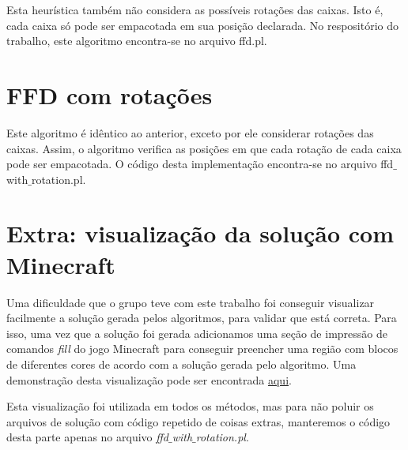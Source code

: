 \documentclass[12pt]{article}
\begin{document}
Esta heurística também não considera as possíveis rotações das caixas. Isto é, cada caixa só pode ser empacotada em sua posição declarada. No respositório do trabalho, este algoritmo encontra-se no arquivo ffd.pl.


\section{FFD com rotações}

Este algoritmo é idêntico ao anterior, exceto por ele considerar rotações das caixas. Assim, o algoritmo verifica as posições em que cada rotação de cada caixa pode ser empacotada. O código desta implementação encontra-se no arquivo ffd$\_$with$\_$rotation.pl.

\section{Extra: visualização da solução com Minecraft}

Uma dificuldade que o grupo teve com este trabalho foi conseguir visualizar facilmente a solução gerada pelos algoritmos, para validar que está correta. Para isso, uma vez que a solução foi gerada adicionamos uma seção de impressão de comandos \textit{fill} do jogo Minecraft para conseguir preencher uma região com blocos de diferentes cores de acordo com a solução gerada pelo algoritmo. Uma demonstração desta visualização pode ser encontrada \href{https://www.youtube.com/watch?v=qInZZb9y1dQ}{aqui}.

Esta visualização foi utilizada em todos os métodos, mas para não poluir os arquivos de solução com código repetido de coisas extras, manteremos o código desta parte apenas no arquivo \textit{ffd$\_$with$\_$rotation.pl}.
\end{document}
